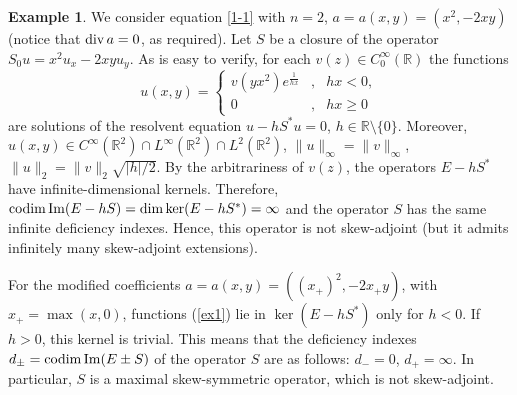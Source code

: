\documentclass[12pt]{article}
\theoremstyle{plain}
\theoremstyle{definition}
\newtheorem{example}{Example}[section]
\numberwithin{equation}{section}
\newcommand{\R}{{\mathbb R}}
\newcommand{\codim}{\mathop{\rm codim}}
\renewcommand{\div}{\mathop{\rm div}\nolimits}
\renewcommand{\Im}{\mathop{\rm Im}}
\begin{document}
\begin{example}\label{Ex}
We consider equation \eqref{1-1} with $n=2$, $a=a(x,y)=(x^2,-2xy)$ (notice that $\div a=0$, as required). Let $S$ be a closure of the operator $S_0u=x^2u_x-2xyu_y$. As is easy to verify, for each $v(z)\in C_0^\infty(\R)$ the functions
\begin{equation}\label{ex1}
u(x,y)=\left\{\begin{array}{lcr} v(yx^2)e^{\frac{1}{hx}} & , & hx<0, \\ 0 & , & hx\ge 0 \end{array}\right.
\end{equation}
are solutions of the resolvent equation $u-hS^*u=0$, $h\in\R\setminus\{0\}$. Moreover,
$u(x,y)\in C^\infty(\R^2)\cap L^\infty(\R^2)\cap L^2(\R^2)$, $\|u\|_\infty=\|v\|_\infty$, $\|u\|_2=\|v\|_2\sqrt{|h|/2}$.
By the arbitrariness of $v(z)$, the operators $E-hS^*$ have infinite-dimensional kernels. Therefore, $\codim\Im(E-hS)=\dim\ker(E-hS^*)=\infty$ and the operator $S$ has the same infinite deficiency indexes. Hence, this operator is not skew-adjoint (but it admits infinitely many skew-adjoint extensions).

For the modified coefficients $a=a(x,y)=((x_+)^2,-2x_+y)$, with $x_+=\max(x,0)$, functions
(\ref{ex1}) lie in $\ker(E-hS^*)$ only for $h<0$. If $h>0$, this kernel is trivial. This means that the deficiency indexes $d_\pm=\codim\Im(E\pm S)$ of the operator $S$ are as follows: $d_-=0$, $d_+=\infty$. In particular, $S$ is a maximal skew-symmetric operator, which is not skew-adjoint.
\end{example}
\end{document}
